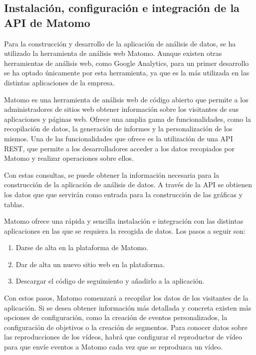 \subsection{Instalación, configuración e integración de la API de Matomo}
\label{sec:configuracion-matomo}

Para la construcción y desarrollo de la aplicación de análisis de datos, se ha utilizado la herramienta de análisis web Matomo. 
Aunque existen otras herramientas de análisis web, como Google Analytics, para un primer desarrollo se ha optado únicamente por 
esta herramienta, ya que es la más utilizada en las distintas aplicaciones de la empresa. 

Matomo \cite{matomo} es una herramienta de análisis web de código abierto que permite a los administradores de sitios web
obtener información sobre los visitantes de sus aplicaciones y páginas web. Ofrece una amplia gama de funcionalidades, como la
recopilación de datos, la generación de informes y la personalización de los mismos. Una de las funcionalidades que ofrece es 
la utilización de una API REST, que permite a los desarrolladores acceder a los datos recopiados por Matomo y realizar operaciones
sobre ellos. 

Con estas consultas, se puede obtener la información necesaria para la construcción de la aplicación de análisis de datos.
A través de la API se obtienen los datos que que servirán como entrada para la construcción de las gráficas y tablas.

Matomo ofrece una rápida y sencilla instalación e integración con las distintas aplicaciones en las que se requiera la 
recogida de datos. Los pasos a seguir son: 

\begin{enumerate}
    \item Darse de alta en la plataforma de Matomo.
    \item Dar de alta un nuevo sitio web en la plataforma.
    \item Descargar el código de seguimiento y añadirlo a la aplicación.
\end{enumerate}

Con estos pasos, Matomo comenzará a recopilar los datos de los visitantes de la aplicación. Si se desea obtener información más
detallada y concreta existen más opciones de configuración, como la creación de eventos personalizados, la configuración de
objetivos o la creación de segmentos. Para conocer datos sobre las reproducciones de los vídeos, habrá que configurar el reproductor
de vídeo para que envíe eventos a Matomo cada vez que se reproduzca un vídeo.

